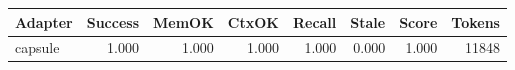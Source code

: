 \begin{tabular}{lrrrrrrr}
\hline
Adapter & Success & MemOK & CtxOK & Recall & Stale & Score & Tokens \\
\hline
capsule & 1.000 & 1.000 & 1.000 & 1.000 & 0.000 & 1.000 & 11848 \\
\hline
\end{tabular}
